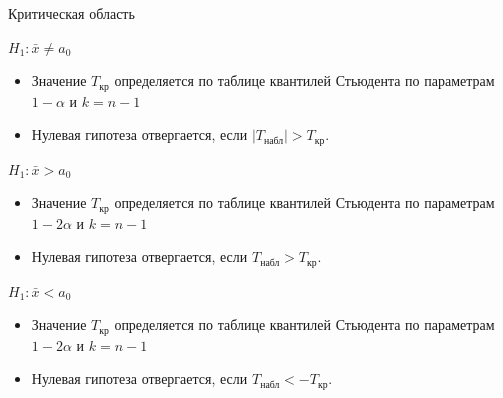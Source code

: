\documentclass[unicode,11pt,notheorems,xcolor=table]{beamer}
\begin{document}
\begin{frame}{Критическая область}{}
 
    $H_1\colon \bar{x} \neq  a_0$
    \begin{itemize}
            \item Значение $T_\text{кр}$ определяется по таблице квантилей Стьюдента по параметрам $1-\alpha$ и $k=n-1$
            \item Нулевая гипотеза отвергается, если \hfill $|T_\text{набл}| > T_\text{кр}$.
    \end{itemize}

    \vfill
    $H_1\colon \bar{x} >  a_0$  
    \begin{itemize}
        \item Значение $T_\text{кр}$ определяется по таблице квантилей Стьюдента по параметрам $1-2\alpha$ и $k=n-1$
        \item Нулевая гипотеза отвергается, если \hfill $T_\text{набл} > T_\text{кр}$.
    \end{itemize}        
    \vfill

    $H_1\colon \bar{x} <  a_0$    
    \begin{itemize}
        \item Значение $T_\text{кр}$ определяется по таблице квантилей Стьюдента по параметрам $1-2\alpha$ и $k=n-1$
        \item Нулевая гипотеза отвергается, если \hfill $T_\text{набл} < - T_\text{кр}$.
    \end{itemize}        
\end{frame}




\end{document}
